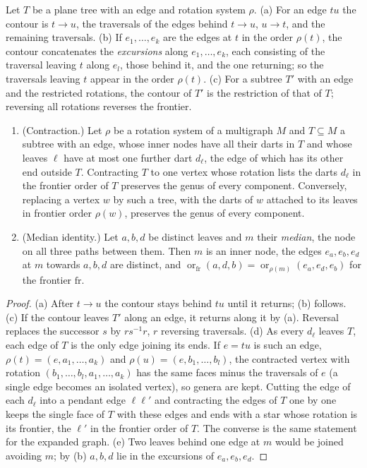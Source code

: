 \begin{lemma}\label{lem:v4-median}\label{lem:v4-contract}
Let $T$ be a plane tree with an edge and rotation system $\rho$. (a) For an
edge $tu$ the contour is $t\to u$, the traversals of the edges behind
$t\to u$, $u\to t$, and the remaining traversals. (b) If $e_1,\dots,e_k$ are
the edges at $t$ in the order $\rho(t)$, the contour concatenates the
\emph{excursions} along $e_1,\dots,e_k$, each consisting of the traversal
leaving $t$ along $e_l$, those behind it, and the one returning; so the
traversals leaving $t$ appear in the order $\rho(t)$. (c) For a subtree
$T'$ with an edge and the restricted rotations, the contour of $T'$ is the
restriction of that of $T$; reversing all rotations reverses the frontier.
\begin{enumerate}[label=(\alph*),nosep,start=4]
\item (Contraction.) Let $\rho$ be a rotation system of a multigraph $M$ and
$T\subseteq M$ a subtree with an edge, whose inner nodes have all their
darts in $T$ and whose leaves $\ell$ have at most one further dart
$d_\ell$, the edge of which has its other end outside $T$. Contracting $T$
to one vertex whose rotation lists the darts $d_\ell$ in the frontier order
of $T$ preserves the genus of every component. Conversely, replacing a
vertex $w$ by such a tree, with the darts of $w$ attached to its leaves in
frontier order $\rho(w)$, preserves the genus of every component.
\item (Median identity.) Let $a,b,d$ be distinct leaves and $m$ their
\emph{median}, the node on all three paths between them. Then $m$ is an
inner node, the edges $e_a,e_b,e_d$ at $m$ towards $a,b,d$ are distinct,
and $\operatorname{or}_{\mathrm{fr}}(a,d,b)=\operatorname{or}_{\rho(m)}
(e_a,e_d,e_b)$ for the frontier $\mathrm{fr}$.
\end{enumerate}
\end{lemma}

\begin{proof}
(a) After $t\to u$ the contour stays behind $tu$ until it returns; (b)
follows. (c) If the contour leaves $T'$ along an edge, it returns along it
by (a). Reversal replaces the successor $s$ by $rs^{-1}r$, $r$ reversing
traversals. (d) As every $d_\ell$ leaves $T$, each edge of $T$ is the only
edge joining its ends. If $e=tu$ is such an edge, $\rho(t)=(e,a_1,\dots,a_k)$
and $\rho(u)=(e,b_1,\dots,b_l)$, the contracted vertex with rotation
$(b_1,\dots,b_l,a_1,\dots,a_k)$ has the same faces minus the traversals of
$e$ (a single edge becomes an isolated vertex), so genera are kept.
Cutting the edge of each $d_\ell$ into a pendant edge $\ell\ell'$ and
contracting the edges of $T$ one by one keeps the single face of $T$ with
these edges and ends with a star whose rotation is its frontier, the
$\ell'$ in the frontier order of $T$. The converse is the same statement for
the expanded graph. (e) Two leaves behind one edge at $m$ would be joined
avoiding $m$; by (b) $a,b,d$ lie in the excursions of $e_a,e_b,e_d$.
\end{proof}

